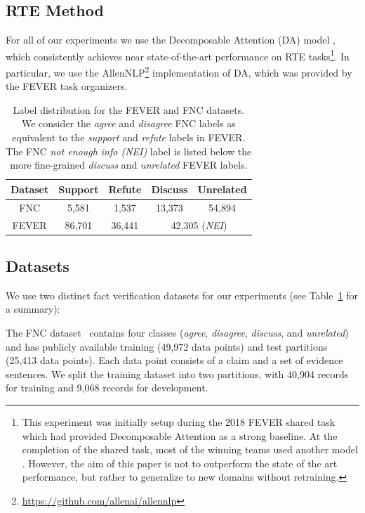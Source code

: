\subsection{RTE Method}
For all of our experiments we use the Decomposable Attention (DA) model \cite{parikh2016decomposable}, which consistently achieves near state-of-the-art performance on RTE tasks\footnote{This experiment was initially setup during the 2018 FEVER shared task which had provided Decomposable Attention as a strong baseline. At the completion of the shared task, most of the winning teams used another model \cite{chen2016enhanced}. However, the aim of this paper is not to outperform the state of the art performance, but rather to generalize to new domains without retraining.}. In particular, we use the AllenNLP\footnote{\url{https://github.com/allenai/allennlp}}
implementation of DA, which was provided by the FEVER task organizers.

\begin{table}
    \centering
    \footnotesize
    \begin{tabular}{ccccc}
        Dataset & Support & Refute & Discuss & Unrelated \\
        \hline
        FNC    & 5,581 & 1,537  & 13,373 & 54,894 \\
        FEVER  &  86,701 & 36,441  & \multicolumn{2}{c}{42,305 (\textit{NEI})} \\
    \end{tabular}
    \caption{Label distribution for the FEVER and FNC datasets.  We consider the \textit{agree} and \textit{disagree} FNC labels as equivalent to the \textit{support} and \textit{refute} labels in FEVER. The FNC \textit{not enough info (NEI)} label is listed below the more fine-grained \textit{discuss} and \textit{unrelated} FEVER labels.  }
    \label{tab:data}
\end{table}

\subsection{Datasets}
We use two distinct fact verification datasets for our experiments (see Table~\ref{tab:data} for a summary):

{}
The FNC dataset~\citep{pomerleau2017fake} contains four classes (\textit{agree}, \textit{disagree}, \textit{discuss}, and \textit{unrelated}) and has publicly available training (49,972 data points) and test partitions (25,413 data points). Each data point consists of a claim and a set of evidence sentences.  We split the training dataset into two partitions, with 40,904 records for training and 9,068 records for development.




